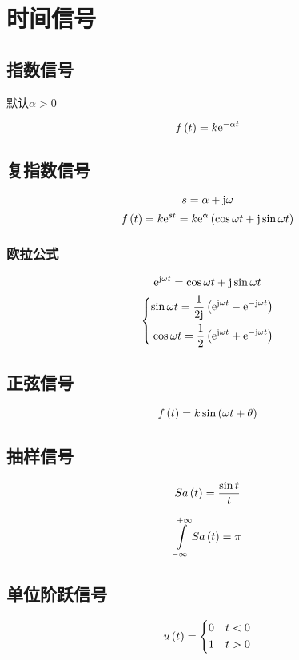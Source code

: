 \documentclass{article}
\begin{document}
\section{时间信号}

\subsection{指数信号}

默认$\alpha>0$

\[f\left(t\right)=k\mathrm e^{-\alpha t}\]

\subsection{复指数信号}

\[s=\alpha+\mathrm j\omega\]
\[f\left(t\right)=k\mathrm e^{st}=k\mathrm e^\alpha\left(\cos\omega t+\mathrm j\sin\omega t\right)\]

\subsubsection{欧拉公式}

\[\mathrm e^{\mathrm j\omega t}=\cos\omega t+\mathrm j\sin\omega t\]
\[\left\{\begin{aligned}
        \sin\omega t=\frac1{2\mathrm j}\left(\mathrm e^{\mathrm j\omega t}-\mathrm e^{-\mathrm j\omega t}\right) \\
        \cos\omega t=\frac12\left(\mathrm e^{\mathrm j\omega t}+\mathrm e^{-\mathrm j\omega t}\right)     \\
    \end{aligned}\right.\]

\subsection{正弦信号}

\[f\left(t\right)=k\sin\left(\omega t+\theta\right)\]

\subsection{抽样信号}

\[Sa\left(t\right)=\frac{\sin t}t\]

\[\int\limits_{-\infty}^{+\infty} Sa\left(t\right)=\pi\]

\subsection{单位阶跃信号}

\[u\left(t\right)=
    \left\{\begin{aligned}
        0 &  & t<0 \\
        1 &  & t>0
    \end{aligned}\right.\]
\end{document}
